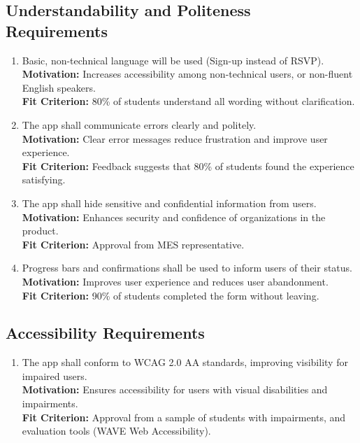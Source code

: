 \documentclass[12pt]{article}
\begin{document}
\subsection{Understandability and Politeness Requirements}
\begin{enumerate}[label=\bfseries UR-\arabic*:, wide=0pt, leftmargin=*,,ref=\bfseries UHR-UPR\arabic*]
  \item \label{UHUPR1} Basic, non-technical language will be used (Sign-up instead of RSVP).\\[2mm]
    {\bf Motivation:} Increases accessibility among non-technical users, or non-fluent English speakers.\\
    {\bf Fit Criterion:} 80\% of students understand all wording without clarification.
  \item \label{UHUPR2} The app shall communicate errors clearly and politely.\\[2mm]
    {\bf Motivation:} Clear error messages reduce frustration and improve user experience.\\
    {\bf Fit Criterion:} Feedback suggests that 80\% of students found the experience satisfying.
  \item \label{UHUPR3} The app shall hide sensitive and confidential information from users.\\[2mm]
    {\bf Motivation:} Enhances security and confidence of organizations in the product.\\
    {\bf Fit Criterion:} Approval from MES representative.
  \item Progress bars and confirmations shall be used to inform users of their status.\\[2mm]
    {\bf Motivation:} Improves user experience and reduces user abandonment.\\
    {\bf Fit Criterion:} 90\% of students completed the form without leaving.
\end{enumerate}

\subsection{Accessibility Requirements}
\begin{enumerate}[label=\bfseries AC-\arabic*:, wide=0pt, leftmargin=*,ref=\bfseries UHR-AR\arabic*]
  \item \label{UHAR1} The app shall conform to WCAG 2.0 AA standards, improving visibility for impaired users.\\[2mm]
    {\bf Motivation:} Ensures accessibility for users with visual disabilities and impairments.\\
    {\bf Fit Criterion:} Approval from a sample of students with impairments, and evaluation tools (WAVE Web Accessibility).
\end{enumerate}
\end{document}

